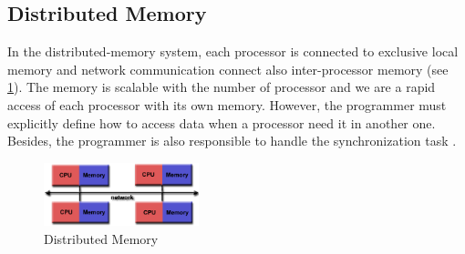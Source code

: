 \subsection{Distributed Memory}
In the distributed-memory system, each processor is connected to exclusive local memory and network communication connect also inter-processor memory (see \ref{dmemory}). The memory is scalable with the number of processor and we are a rapid access of each processor with its own memory. However, the programmer must explicitly define how to access data when a processor need it in another one. Besides, the programmer is also responsible to handle the synchronization task \cite{Hager2010}.
\begin{figure}[!h]
\centering 
\includegraphics[width=0.4\textwidth]{images/d-memory.png}
\caption{Distributed Memory}
\label{dmemory} 
\end{figure}


